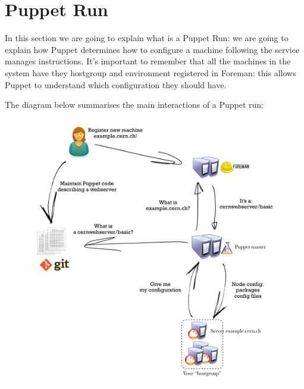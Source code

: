 \section{Puppet Run}

In this section we are going to explain what is a Puppet Run: we are going
to explain how Puppet determines how to configure a machine following the
service manages instructions. It's important to remember that all the
machines in the system have they hostgroup and environment registered in
Foreman: this allows Puppet to understand which configuration they should
have.

The diagram below summarises the main interactions of a Puppet run:

\begin{figure}[H]
\includegraphics[width=\textwidth,height=\textheight,keepaspectratio]{ConfigurationManagement/PuppetRun/PuppetRun.png}
\end{figure}

